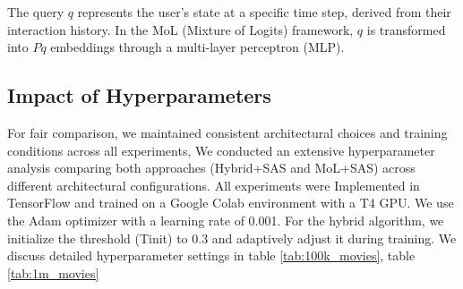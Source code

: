 \documentclass[review]{jair}
\begin{document}
The query \( q \) represents the user's state at a specific time step, derived from their interaction history. In the MoL (Mixture of Logits) framework, \( q \) is transformed into \( Pq \)
embeddings through a multi-layer perceptron (MLP).
\subsection{Impact of Hyperparameters}
For fair comparison, we maintained consistent architectural choices and training conditions across all experiments, We conducted an extensive hyperparameter analysis comparing both approaches (Hybrid+SAS and MoL+SAS) across different architectural configurations. All experiments were Implemented in TensorFlow and trained on a Google Colab environment with a T4 GPU. We use the Adam optimizer with a learning rate of 0.001. For the hybrid algorithm, we initialize the threshold (Tinit) to 0.3 and adaptively adjust it during training. We discuss detailed hyperparameter settings in table \ref{tab:100k_movies}, table \ref{tab:1m_movies}


\setlength{\tabcolsep}{1pt} %
%
\end{document}
